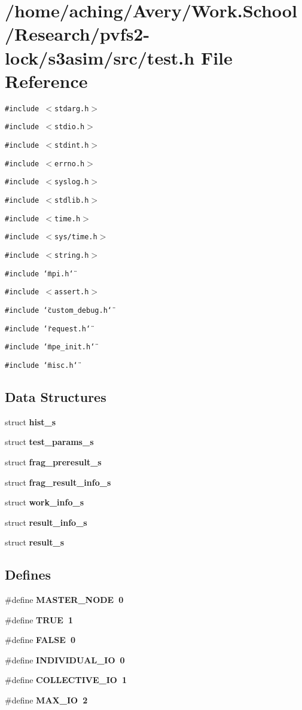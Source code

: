 \section{/home/aching/Avery/Work.School/Research/pvfs2-lock/s3asim/src/test.h File Reference}
\label{test_8h}
{\tt \#include $<$stdarg.h$>$}\par
{\tt \#include $<$stdio.h$>$}\par
{\tt \#include $<$stdint.h$>$}\par
{\tt \#include $<$errno.h$>$}\par
{\tt \#include $<$syslog.h$>$}\par
{\tt \#include $<$stdlib.h$>$}\par
{\tt \#include $<$time.h$>$}\par
{\tt \#include $<$sys/time.h$>$}\par
{\tt \#include $<$string.h$>$}\par
{\tt \#include \char`\"{}mpi.h\char`\"{}}\par
{\tt \#include $<$assert.h$>$}\par
{\tt \#include \char`\"{}custom\_\-debug.h\char`\"{}}\par
{\tt \#include \char`\"{}request.h\char`\"{}}\par
{\tt \#include \char`\"{}mpe\_\-init.h\char`\"{}}\par
{\tt \#include \char`\"{}misc.h\char`\"{}}\par
\subsection*{Data Structures}
\begin{CompactItemize}
\item 
struct \bf{hist\_\-s}
\item 
struct \bf{test\_\-params\_\-s}
\item 
struct \bf{frag\_\-preresult\_\-s}
\item 
struct \bf{frag\_\-result\_\-info\_\-s}
\item 
struct \bf{work\_\-info\_\-s}
\item 
struct \bf{result\_\-info\_\-s}
\item 
struct \bf{result\_\-s}
\end{CompactItemize}
\subsection*{Defines}
\begin{CompactItemize}
\item 
\#define \bf{MASTER\_\-NODE}~0
\item 
\#define \bf{TRUE}~1
\item 
\#define \bf{FALSE}~0
\item 
\#define \bf{INDIVIDUAL\_\-IO}~0
\item 
\#define \bf{COLLECTIVE\_\-IO}~1
\item 
\#define \bf{MAX\_\-IO}~2
\end{CompactItemize}


